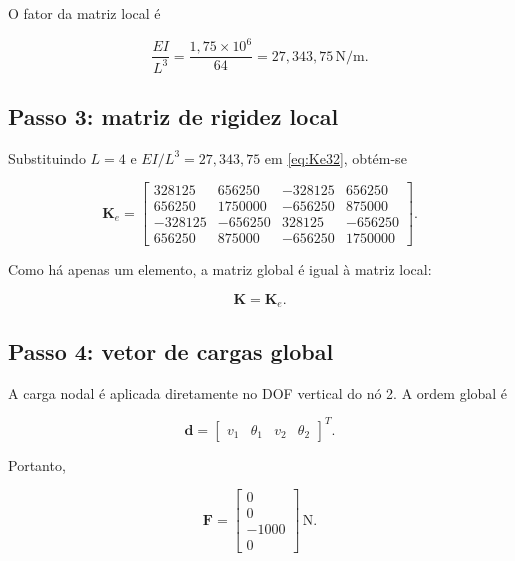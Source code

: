 \documentclass[12pt,a4paper]{article}
\newcommand{\unit}[1]{\,\mathrm{#1}}
\begin{document}
O fator da matriz local é

\begin{equation}
  \frac{EI}{L^3} = \frac{1{,}75\times10^6}{64}
  = 27{,}343{,}75\unit{N/m}.
  \label{eq:ex_factor}
\end{equation}

\subsection{Passo 3: matriz de rigidez local}

Substituindo \(L=4\) e \(EI/L^3=27{,}343{,}75\) em \eqref{eq:Ke32}, obtém-se

\begin{equation}
  \mathbf{K}_e =
  \begin{bmatrix}
    328125 & 656250 & -328125 & 656250\\
    656250 & 1750000 & -656250 & 875000\\
    -328125 & -656250 & 328125 & -656250\\
    656250 & 875000 & -656250 & 1750000
  \end{bmatrix}.
  \label{eq:ex_Ke}
\end{equation}

Como há apenas um elemento, a matriz global é igual à matriz local:

\begin{equation}
  \mathbf{K} = \mathbf{K}_e.
  \label{eq:ex_Kglobal}
\end{equation}

\subsection{Passo 4: vetor de cargas global}

A carga nodal é aplicada diretamente no DOF vertical do nó 2. A ordem global é

\begin{equation}
  \mathbf{d} =
  \begin{bmatrix}
    v_1 & \theta_1 & v_2 & \theta_2
  \end{bmatrix}^T.
  \label{eq:ex_d}
\end{equation}

Portanto,

\begin{equation}
  \mathbf{F} =
  \begin{bmatrix}
    0\\0\\-1000\\0
  \end{bmatrix}\unit{N}.
  \label{eq:ex_F}
\end{equation}
\end{document}
